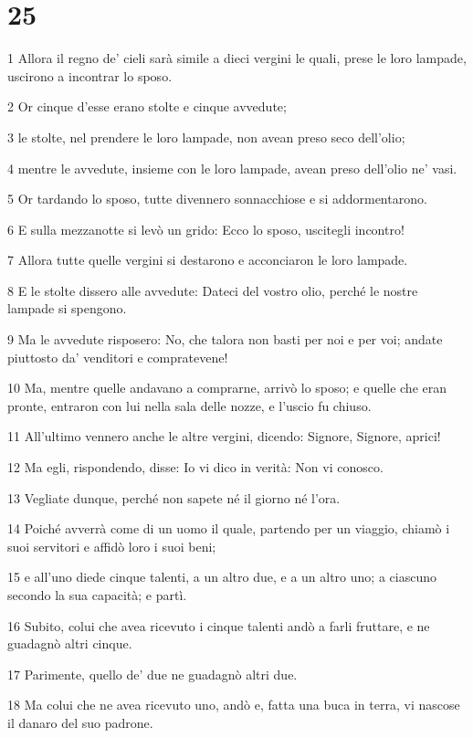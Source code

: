 \chapter{25}

\par 1 Allora il regno de' cieli sarà simile a dieci vergini le quali, prese le loro lampade, uscirono a incontrar lo sposo.
\par 2 Or cinque d'esse erano stolte e cinque avvedute;
\par 3 le stolte, nel prendere le loro lampade, non avean preso seco dell'olio;
\par 4 mentre le avvedute, insieme con le loro lampade, avean preso dell'olio ne' vasi.
\par 5 Or tardando lo sposo, tutte divennero sonnacchiose e si addormentarono.
\par 6 E sulla mezzanotte si levò un grido: Ecco lo sposo, uscitegli incontro!
\par 7 Allora tutte quelle vergini si destarono e acconciaron le loro lampade.
\par 8 E le stolte dissero alle avvedute: Dateci del vostro olio, perché le nostre lampade si spengono.
\par 9 Ma le avvedute risposero: No, che talora non basti per noi e per voi; andate piuttosto da' venditori e compratevene!
\par 10 Ma, mentre quelle andavano a comprarne, arrivò lo sposo; e quelle che eran pronte, entraron con lui nella sala delle nozze, e l'uscio fu chiuso.
\par 11 All'ultimo vennero anche le altre vergini, dicendo: Signore, Signore, aprici!
\par 12 Ma egli, rispondendo, disse: Io vi dico in verità: Non vi conosco.
\par 13 Vegliate dunque, perché non sapete né il giorno né l'ora.
\par 14 Poiché avverrà come di un uomo il quale, partendo per un viaggio, chiamò i suoi servitori e affidò loro i suoi beni;
\par 15 e all'uno diede cinque talenti, a un altro due, e a un altro uno; a ciascuno secondo la sua capacità; e partì.
\par 16 Subito, colui che avea ricevuto i cinque talenti andò a farli fruttare, e ne guadagnò altri cinque.
\par 17 Parimente, quello de' due ne guadagnò altri due.
\par 18 Ma colui che ne avea ricevuto uno, andò e, fatta una buca in terra, vi nascose il danaro del suo padrone.
